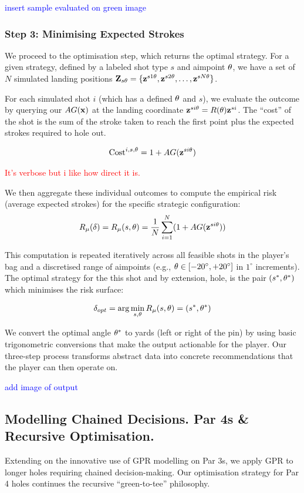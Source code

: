 \documentclass[11pt, letterpaper]{article}
\begin{document}
\textcolor{blue}{insert sample evaluated on green image}

\subsubsection{Step 3: Minimising Expected Strokes}
\label{subsec: minimise}

We proceed to the optimisation step, which returns the optimal strategy. For a given strategy, defined by a labeled shot type $s$ and aimpoint $\theta$, we have a set of $N$ simulated landing positions $\mathbf{Z}_{s\theta} = \{\mathbf{z}^{s1\theta}, \mathbf{z}^{s2\theta}, \ldots, \mathbf{z}^{sN\theta}\}$. 

For each simulated shot $i$ (which has a defined $\theta$ and $s$), we evaluate the outcome by querying our  $AG(\mathbf{x})$ at the landing coordinate $\mathbf{z}^{si\theta} =  R(\theta)\mathbf{z}^{si} $. The ``cost'' of the shot is the sum of the stroke taken to reach the first point plus the expected strokes required to hole out.

$$\text{Cost}^{i,s, \theta} = 1 + AG(\mathbf{z}^{si\theta} )$$

\textcolor{red}{It's verbose but i like how direct it is.}

We then aggregate these individual outcomes to compute the empirical risk (average expected strokes) for the specific strategic configuration:
$$R_\mu(\delta) = R_\mu(s, \theta) = \frac{1}{N} \sum ^N_{i=1} (1+ AG(\mathbf{z}^{si\theta}))$$


This computation is repeated iteratively across all feasible shots in the player's bag and a discretised range of aimpoints (e.g., $\theta \in [-20^\circ, +20^\circ]$ in $1^\circ$ increments). The optimal strategy for the this shot and by extension, hole, is the pair $(s^*, \theta^*)$ which minimises the risk surface:

$$\delta_{opt} = \arg \min_{s, \theta} R_\mu(s, \theta) = (s^*, \theta^*)$$

We convert the optimal angle $\theta^*$ to yards (left or right of the pin) by using basic trigonometric conversions that make the output actionable for the player. Our three-step process transforms abstract data into concrete recommendations that the player can then operate on.

\textcolor{blue}{add image of output}

\subsection{Modelling Chained Decisions. Par 4s \& Recursive Optimisation.} 
\label{subsec: par4}
Extending on the innovative use of GPR modelling on Par 3s, we apply GPR to longer holes requiring chained decision-making. Our optimisation strategy for Par 4 holes continues the recursive ``green-to-tee'' philosophy. 
\end{document}
